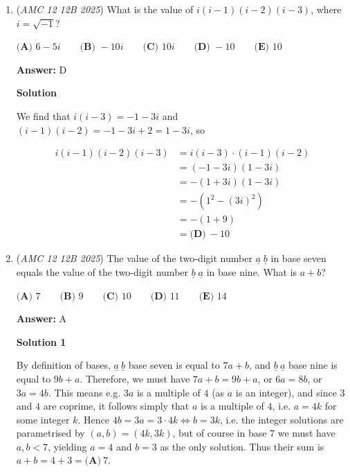 \begin{enumerate}
 Now compute

 
 \[5 \cdot 6 \cdot 1 = 30.\]

 Thus

 
 \[\sum_{n=1}^{2025} n^2 \equiv 30 \cdot 6^{-1} \pmod{10}.\]

 Compute the inverse of 6 modulo 10.Solve \( 6x \equiv 1 \pmod{10} \).No such \( x \) exists because \( \gcd(6, 10) = 2 \neq 1 \).Therefore this modular-verification method is unusable, so we immediately stop and simply trust the earlier cycle-counting method.

 Thus the sum of the ones digits of the first 2025 squares is

 
 \[9115.\]



	\item (\textit{AMC 12 12B 2025}) What is the value of $i(i-1)(i-2)(i-3)$, where $i=\sqrt{-1}$?


 $\textbf{(A) } 6-5i \qquad\textbf{(B) } -10i \qquad\textbf{(C) } 10i \qquad\textbf{(D) } -10 \qquad\textbf{(E) } 10$

 \textbf{Answer: }D



\textbf{Solution}

We find that $i(i-3)=-1-3i$ and $(i-1)(i-2)=-1-3i+2=1-3i$, so

 \begin{align}i(i-1)(i-2)(i-3)&=i(i-3)\cdot (i-1)(i-2)\\&=(-1-3i)(1-3i)\\&=-(1+3i)(1-3i)\\&=-(1^2-(3i)^2)\\&=-(1+9)\\&=\boxed{\textbf{(D)}~-10 }\end{align}

 


	\item (\textit{AMC 12 12B 2025}) The value of the two-digit number $\underline{a}\;\underline{b}$ in base seven equals the value of the two-digit number $\underline{b}\;\underline{a}$ in base nine. What is $a+b$?


 $\textbf{(A) } 7 \qquad\textbf{(B) } 9 \qquad\textbf{(C) } 10 \qquad\textbf{(D) } 11 \qquad\textbf{(E) } 14$

 \textbf{Answer: }A



\textbf{Solution 1}

By definition of bases, $\underline{a}~\underline{b}$ base seven is equal to $7a+b$, and $\underline{b}~\underline{a}$ base nine is equal to $9b+a$. Therefore, we must have $7a+b=9b+a$, or $6a=8b$, or $3a=4b$. This means e.g. $3a$ is a multiple of $4$ (as $a$ is an integer), and since $3$ and $4$ are coprime, it follows simply that $a$ is a multiple of $4$, i.e. $a = 4k$ for some integer $k$. Hence $4b = 3a = 3 \cdot 4k \iff b = 3k$, i.e. the integer solutions are parametrised by $(a,b) = (4k,3k)$, but of course in base $7$ we must have $a,b < 7$, yielding $a=4$ and $b=3$ as the only solution. Thus their sum is $a+b = 4+3 = \boxed{\textbf{(A)}~7}$.


\end{enumerate}
